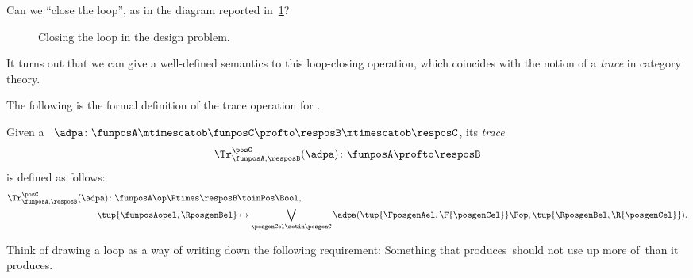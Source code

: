 Can we ``close the loop'', as in the diagram reported in~\cref{fig:extrace_2}?
\begin{figure}[h!]
    \centering
    \caption{Closing the loop in the design problem.
    }
    \label{fig:extrace_2}
\end{figure}

It turns out that we can give a well-defined semantics to this loop-closing operation, which coincides with the notion of a \emph{trace} in category theory.

The following is the formal definition of the trace operation for .

\begin{definition}
    \label{def:dp-trace}
    Given a ~$\adpa\colon  \funposA \mtimescatob \funposC \profto \resposB \mtimescatob \resposC$, its \emph{trace}
    \begin{equation}
        \Tr_{\funposA,\resposB}^\posC(\adpa) \colon \funposA \profto \resposB
    \end{equation}
    is defined as follows:
    \begin{equation}
        \label{eq:tracedef}
        \begin{aligned}
            \Tr_{\funposA,\resposB}^\posC(\adpa) \colon  \funposA\op \Ptimes \resposB & \toinPos \Bool, \\
            \tup{\funposAopel, \RposgenBel}                                           & \mapsto \bigvee_{\posgenCel \setin \posgenC}
            \adpa(\tup{\FposgenAel, \F{\posgenCel}}\Fop,
            \tup{\RposgenBel, \R{\posgenCel}}).
        \end{aligned}
    \end{equation}
\end{definition}

Think of drawing a loop as a way of writing down the following requirement:
Something that produces~\posC should not use up more of~\posC than it produces.

